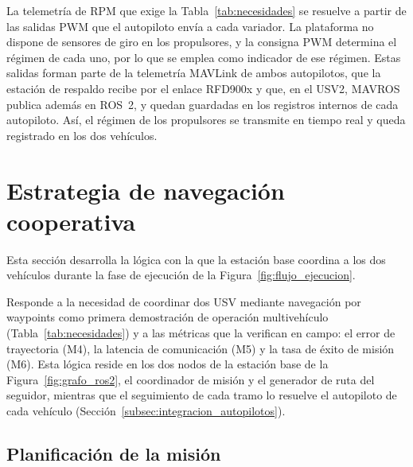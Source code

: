 La telemetría de RPM que exige la Tabla~\ref{tab:necesidades} se resuelve a partir de las salidas PWM que el 
autopiloto envía a cada variador. La plataforma no dispone de sensores de giro en los propulsores, y la consigna 
PWM determina el régimen de cada uno, por lo que se emplea como indicador de ese régimen. Estas salidas forman 
parte de la telemetría MAVLink de ambos autopilotos, que la estación de respaldo recibe por el enlace RFD900x y 
que, en el USV2, MAVROS publica además en ROS~2, y quedan guardadas en los registros internos de cada autopiloto. 
Así, el régimen de los propulsores se transmite en tiempo real y queda registrado en los dos vehículos.


\section{Estrategia de navegación cooperativa}
\label{sec:navegacion_cooperativa}

Esta sección desarrolla la lógica con la que la estación base coordina a los dos vehículos durante la fase de 
ejecución de la Figura~\ref{fig:flujo_ejecucion}. 

Responde a la necesidad de coordinar dos USV mediante navegación por waypoints como primera demostración de 
operación multivehículo (Tabla~\ref{tab:necesidades}) y a las métricas que la verifican en campo: el error de 
trayectoria (M4), la latencia de comunicación (M5) y la tasa de éxito de misión (M6). Esta lógica reside en los 
dos nodos de la estación base de la Figura~\ref{fig:grafo_ros2}, el coordinador de misión y el generador de ruta 
del seguidor, mientras que el seguimiento de cada tramo lo resuelve el autopiloto de cada vehículo 
(Sección~\ref{subsec:integracion_autopilotos}).

\subsection{Planificación de la misión}
\label{subsec:planificacion_mision}

